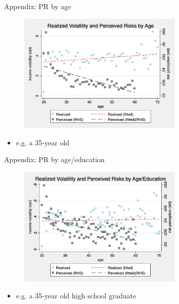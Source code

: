 \documentclass{beamer}
\begin{document}
\begin{frame}{Appendix: PR by age}
	\begin{figure}[ht]
		\label{appendix:age_compare_figure}
		\centering
		\includegraphics[width=0.7\textwidth]{figures/real_log_wage_shk_gr_by_age_compare.png}
	\end{figure}
	\begin{itemize}
		\item e.g. a 35-year old   \quad  \hyperlink{age_compare}{} 
	\end{itemize}
\end{frame}


\begin{frame}{Appendix: PR by age/education}
	\begin{figure}[ht]
		\label{appendix:age_educ_compare_figure}
		\centering
		\includegraphics[width=0.7\textwidth]{figures/real_log_wage_shk_gr_by_age_edu_compare.png}
	\end{figure}
	\begin{itemize}
		\item e.g. a 35-year old high school graduate \quad  \hyperlink{age_compare}{} 
	\end{itemize}
\end{frame}
\end{document}
